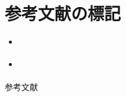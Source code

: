 \documentclass[12pt,xcolor=dvipsnames,table,dvipdfmx, aspectratio=169]{beamer} %
\theoremstyle{definition}
\begin{document}
  \section{参考文献の標記}

  \begin{frame}{\insertsection}
    \begin{itemize}
      \item \citet{arai2013}
      \item \citep{koszegi2014}
    \end{itemize}
  \end{frame}



	\begin{frame}[allowframebreaks]{参考文献} %
			
	\end{frame}
\end{document}
